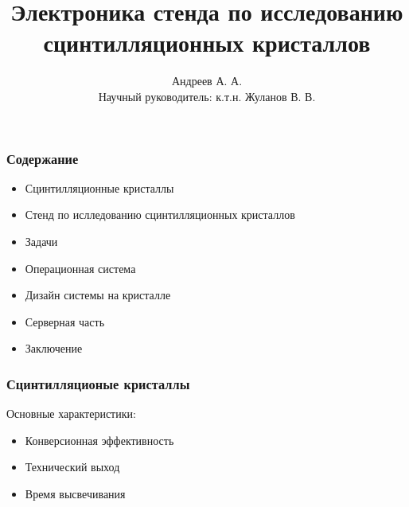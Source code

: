 \documentclass[aspectratio=169]{beamer}
\title{Электроника стенда по исследованию сцинтилляционных кристаллов}
\author{Андреев А. А. \\
        Научный руководитель: к.т.н. Жуланов В. В.}
\institute{Новосибирский Государственный Университет}
\begin{document}
\begin{frame}
\titlepage
\end{frame}

\begin{frame}
\frametitle{Содержание}
    \begin{itemize}  
        \item Сцинтилляционные кристаллы
        \item Стенд по ислледованию сцинтилляционных кристаллов
        \item Задачи
        \item Операционная система
        \item Дизайн системы на кристалле
        \item Серверная часть
        \item Заключение
    \end{itemize}
\end{frame}

\begin{frame}
\frametitle{Сцинтилляционые кристаллы}
    Основные характеристики:
    \begin{itemize}  
        \item Конверсионная эффективность
        \item Технический выход
        \item Время высвечивания 
    \end{itemize}
\end{frame}
\end{document}
